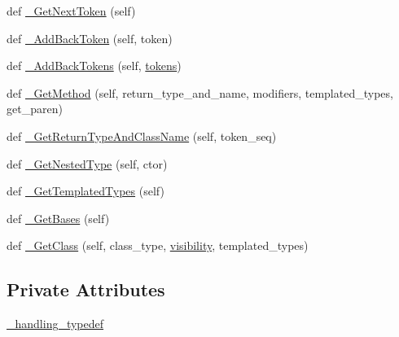 \begin{DoxyCompactItemize}
def \mbox{\hyperlink{classgoogletest-master_1_1googlemock_1_1scripts_1_1generator_1_1cpp_1_1ast_1_1_ast_builder_a7a9479aa158423ae6340d538742634d6}{\+\_\+\+Get\+Next\+Token}} (self)
\item 
def \mbox{\hyperlink{classgoogletest-master_1_1googlemock_1_1scripts_1_1generator_1_1cpp_1_1ast_1_1_ast_builder_ad1cf2f93d528e4ccf3c8364a48549dcd}{\+\_\+\+Add\+Back\+Token}} (self, token)
\item 
def \mbox{\hyperlink{classgoogletest-master_1_1googlemock_1_1scripts_1_1generator_1_1cpp_1_1ast_1_1_ast_builder_a2dbcd849f57d0bd4cfc9ee2a78ed1c53}{\+\_\+\+Add\+Back\+Tokens}} (self, \mbox{\hyperlink{classgoogletest-master_1_1googlemock_1_1scripts_1_1generator_1_1cpp_1_1ast_1_1_ast_builder_a40ec1f428d00d825d7ac3b99734cb0ea}{tokens}})
\item 
def \mbox{\hyperlink{classgoogletest-master_1_1googlemock_1_1scripts_1_1generator_1_1cpp_1_1ast_1_1_ast_builder_a6779b04ef642058fb2c2d662c08bf14a}{\+\_\+\+Get\+Method}} (self, return\+\_\+type\+\_\+and\+\_\+name, modifiers, templated\+\_\+types, get\+\_\+paren)
\item 
def \mbox{\hyperlink{classgoogletest-master_1_1googlemock_1_1scripts_1_1generator_1_1cpp_1_1ast_1_1_ast_builder_a326049eed7523647d816a1e319cd399a}{\+\_\+\+Get\+Return\+Type\+And\+Class\+Name}} (self, token\+\_\+seq)
\item 
def \mbox{\hyperlink{classgoogletest-master_1_1googlemock_1_1scripts_1_1generator_1_1cpp_1_1ast_1_1_ast_builder_a8dcc1e2641687e0ea2b59f44d4c73429}{\+\_\+\+Get\+Nested\+Type}} (self, ctor)
\item 
def \mbox{\hyperlink{classgoogletest-master_1_1googlemock_1_1scripts_1_1generator_1_1cpp_1_1ast_1_1_ast_builder_aa67ba76b4c184f1515e30e23ac0771f7}{\+\_\+\+Get\+Templated\+Types}} (self)
\item 
def \mbox{\hyperlink{classgoogletest-master_1_1googlemock_1_1scripts_1_1generator_1_1cpp_1_1ast_1_1_ast_builder_a0f77c1416e1d9229510a65d66bb2b6d3}{\+\_\+\+Get\+Bases}} (self)
\item 
def \mbox{\hyperlink{classgoogletest-master_1_1googlemock_1_1scripts_1_1generator_1_1cpp_1_1ast_1_1_ast_builder_a9540ed8b07203dd5375536018b7497b5}{\+\_\+\+Get\+Class}} (self, class\+\_\+type, \mbox{\hyperlink{classgoogletest-master_1_1googlemock_1_1scripts_1_1generator_1_1cpp_1_1ast_1_1_ast_builder_a3b68dfb883315893942ac5deba813723}{visibility}}, templated\+\_\+types)
\end{DoxyCompactItemize}
\subsection*{Private Attributes}
\begin{DoxyCompactItemize}
\item 
\mbox{\hyperlink{classgoogletest-master_1_1googlemock_1_1scripts_1_1generator_1_1cpp_1_1ast_1_1_ast_builder_a30bfed18aac0e55ebbe6e85a432141e7}{\+\_\+handling\+\_\+typedef}}
\end{DoxyCompactItemize}


